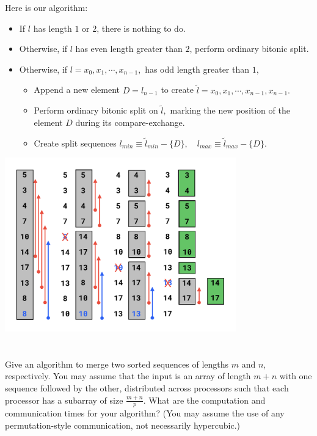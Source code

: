 \documentclass{article}
\begin{document}
Here is our algorithm:

\begin{itemize}
  \item If $l$ has length $1$ or $2$, there is nothing to do.
  \item Otherwise, if $l$ has even length greater than $2$, perform ordinary bitonic split.
  \item Otherwise, if $l = x_0, x_1, \cdots, x_{n-1},$ has odd length greater than $1$, 
  \begin{itemize}
    \item Append a new element $D = l_{n-1}$ to create $\tilde{l} =x_0, x_1, \cdots, x_{n-1}, x_{n-1}.$
    \item Perform ordinary bitonic split on $\tilde{l},$ marking the new position of the element $D$ during its compare-exchange.
    \item Create split sequences $l_{min} \equiv \tilde{l}_{min} - \{D\},\quad l_{max} \equiv \tilde{l}_{max} - \{D\}.$
  \end{itemize}
\end{itemize}

\begin{center}
  \includegraphics[width=100mm]{odd_length_bitonic_sort.pdf}
\end{center}

\section{}
Give an algorithm to merge two sorted sequences of lengths $m$ and $n$, respectively.
You may assume that the input is an array of length $m+n$ with one sequence followed by the other, distributed across processors such that each processor has a subarray of size $\frac{m+n}{p}$.
What are the computation and communication times for your algorithm?
(You may assume the use of any permutation-style communication, not necessarily hypercubic.)
\end{document}
